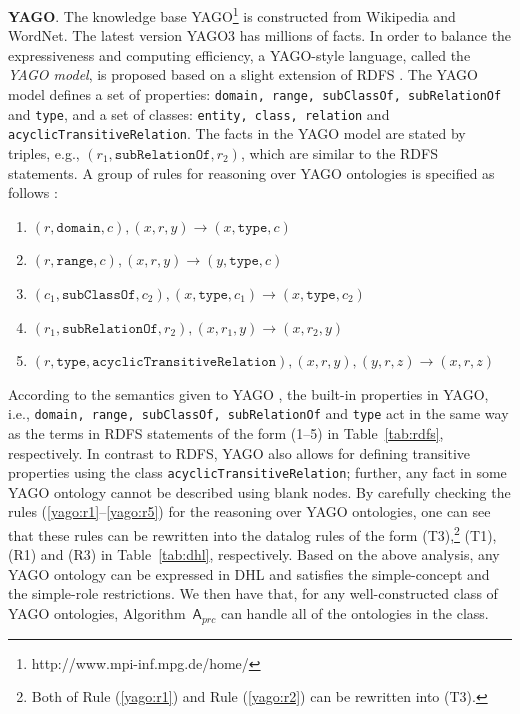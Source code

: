 \textbf{YAGO}. The knowledge base YAGO\footnote{http://www.mpi-inf.mpg.de/home/}
is constructed from Wikipedia and WordNet. The latest version
YAGO3 \cite{MahdisoltaniBS15} has millions of facts.
In order to balance the expressiveness and computing efficiency,
a YAGO-style language, called the \emph{YAGO model}, is proposed based on
a slight extension of RDFS \cite{SuchanekKW08}. The YAGO model defines
a set of properties: \texttt{domain, range, subClassOf, subRelationOf} and \texttt{type},
and a set of classes: \texttt{entity, class, relation} and \texttt{acyclicTransitiveRelation}.
The facts in the YAGO model are stated by triples, e.g., $(r_1,
\texttt{subRelationOf}, r_2)$,
which are similar to the RDFS statements.
A group of rules for reasoning over YAGO ontologies
is specified as follows \cite{SuchanekKW08}:
\begin{enumerate}[leftmargin=8ex,label=(\arabic*),ref=\arabic*]
  \item $(r,\texttt{domain}, c), (x, r, y) \rightarrow (x,
    \texttt{type}, c)$\label{yago:r1}
  \item $(r,\texttt{range}, c), (x, r, y) \rightarrow (y,
    \texttt{type}, c)$\label{yago:r2}
  \item $(c_1, \texttt{subClassOf}, c_2), (x, \texttt{type}, c_1)
    \rightarrow (x, \texttt{type}, c_2)$\label{yago:r3}
  \item $(r_1, \texttt{subRelationOf}, r_2), (x, r_1, y) \rightarrow
    (x, r_2, y)$\label{yago:r4}
  \item $(r, \texttt{type}, \texttt{acyclicTransitiveRelation}), (x,
    r, y), (y, r, z) \rightarrow (x, r, z)$\label{yago:r5}
\end{enumerate}

According to the semantics given to YAGO \cite{SuchanekKW08}, the built-in properties in YAGO,
i.e., \texttt{domain, range, subClassOf, subRelationOf} and \texttt{type} act in the same
way as the terms in RDFS statements of the form (1--5) in Table~\ref{tab:rdfs}, respectively.
In contrast to RDFS, YAGO also allows for defining
transitive properties using the
class \texttt{acyclicTransitiveRelation}; further, any fact in some YAGO ontology cannot be
described using blank nodes. By carefully checking the rules (\ref{yago:r1}--\ref{yago:r5}) for the reasoning over YAGO ontologies,
one can see that these rules can be rewritten into the datalog rules
of the form (T3),\footnote{Both of Rule (\ref{yago:r1}) and
Rule (\ref{yago:r2}) can be rewritten into (T3).} (T1), (R1) and (R3) in Table~\ref{tab:dhl}, respectively.
Based on the above analysis, any YAGO ontology can be expressed in DHL
and satisfies the simple-concept and the simple-role restrictions. We then have that,
for any well-constructed class of YAGO ontologies,
Algorithm~$\mathsf{A}_{prc}$
can handle all of the ontologies in the class.

